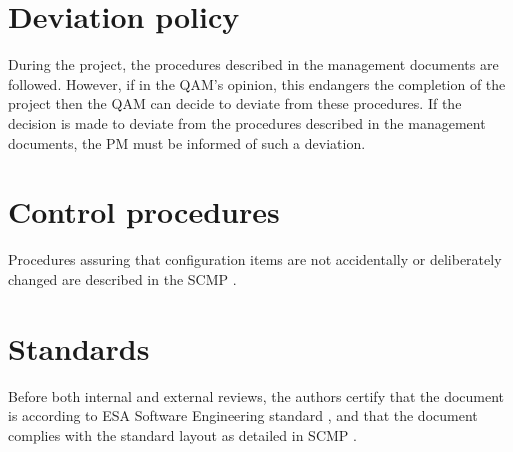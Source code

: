 \section{Deviation policy}
    During the project, the procedures described in the management documents
    are followed. However, if in the QAM’s opinion, this endangers the completion of the
    project then the QAM can decide to deviate from these procedures. If the decision is made
    to deviate from the procedures described in the management documents, the PM must be
    informed of such a deviation.

\section{Control procedures}
Procedures assuring that configuration items are not accidentally or deliberately changed are
described in the SCMP \cite{scmp}.

\section{Standards}
Before both internal and external reviews, the authors certify that the document is according to
ESA Software Engineering standard \cite{esa}, and that the document complies with the standard layout
as detailed in SCMP \cite{scmp}.
